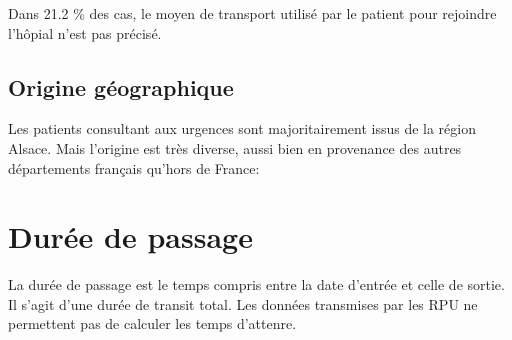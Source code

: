 \documentclass[12pt,english,french,twoside]{report}\usepackage[]{graphicx}\usepackage[]{color}
\begin{document}
Dans 21.2 \% des cas, le moyen de transport utilisé par le patient pour rejoindre l'hôpial n'est pas précisé.

\section*{Origine géographique}



Les patients consultant aux urgences sont majoritairement issus de la région Alsace. Mais l'origine est très diverse, aussi bien en provenance des autres départements français qu'hors de France:



\chapter{Durée de passage}


La durée de passage est le temps compris entre la date d'entrée et celle de sortie. Il s'agit d'une durée de transit total. Les données transmises par les RPU ne permettent pas de calculer les temps d'attenre.
\end{document}
